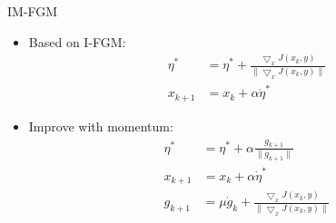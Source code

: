 \documentclass[
 size=12pt,
 paper=smartboard, %
 mode=present, %
 display=slides, %
style=tuliplab,
pauseslide,
fleqn,leqno]{powerdot}
\begin{document}
\begin{slide}{IM-FGM\cite{RN144}}
  \begin{itemize}
    \item Based on I-FGM: \pause
    \begin{equation}
      \begin{split}
        \eta^* &= \eta^* + \frac{\bigtriangledown_xJ(x_{k}, y)}{\|\bigtriangledown_xJ(x_{k}, y)\|} \\
        x_{k+1} &= x_{k} + \alpha \dot \eta^*
      \end{split}
    \end{equation} \pause
    \item Improve with momentum: \pause
    \begin{equation}
      \begin{split}
        \eta^* &= \eta^* + \alpha \frac{g_{k+1}}{\|g_{k+1}\|} \\
        x_{k+1} &= x_{k} + \alpha \dot \eta^* \\
        g_{k+1} &= \mu \dot g_k + \frac{\bigtriangledown_xJ(x_{k}, y)}{\|\bigtriangledown_xJ(x_{k}, y)\|}
      \end{split}
    \end{equation}
  \end{itemize}
\end{slide}
\end{document}
